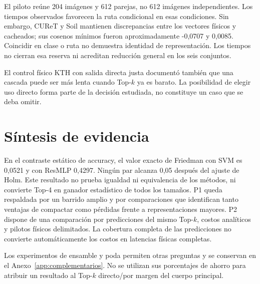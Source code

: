 El piloto reúne 204 imágenes y 612 parejas, no 612 imágenes independientes. Los tiempos observados favorecen la ruta condicional en esas condiciones. Sin embargo, CUReT y Soil mantienen discrepancias entre los vectores físicos y cacheados; sus cosenos mínimos fueron aproximadamente -0,0707 y 0,0085. Coincidir en clase o ruta no demuestra identidad de representación. Los tiempos no cierran esa reserva ni acreditan reducción general en los seis conjuntos.

El control físico KTH con salida directa justa documentó también que una cascada puede ser más lenta cuando Top-\(k\) ya es barato. La posibilidad de elegir uso directo forma parte de la decisión estudiada, no constituye un caso que se deba omitir.

\section{Síntesis de evidencia}


En el contraste estático de accuracy, el valor exacto de Friedman con SVM es 0,0521 y con ResMLP 0,4297. Ningún par alcanza 0,05 después del ajuste de Holm. Este resultado no prueba igualdad ni equivalencia de los métodos, ni convierte Top-4 en ganador estadístico de todos los tamaños.
P1 queda respaldada por un barrido amplio y por comparaciones que identifican tanto ventajas de compactar como pérdidas frente a representaciones mayores. P2 dispone de una comparación por predicciones del mismo Top-\(k\), costos analíticos y pilotos físicos delimitados. La cobertura completa de las predicciones no convierte automáticamente los costos en latencias físicas completas.

Los experimentos de ensamble y poda permiten otras preguntas y se conservan en el Anexo~\ref{app:complementarios}. No se utilizan sus porcentajes de ahorro para atribuir un resultado al Top-\(k\) directo/por margen del cuerpo principal.
